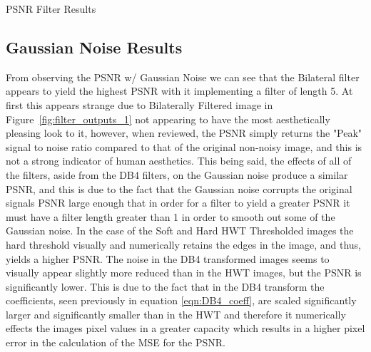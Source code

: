 \documentclass{article}\raggedbottom
\begin{document}
\begin{table}[H]
	\centering
	\caption{PSNR Filter Results}
	\label{tab:psnr_results}
\end{table}

\subsection{Gaussian Noise Results} 
From observing the PSNR w/ Gaussian Noise we can see that the Bilateral filter appears to yield the highest PSNR with it implementing a filter of length 5. At first this appears strange due to Bilaterally Filtered image in Figure~\ref{fig:filter_outputs_1} not appearing to have the most aesthetically pleasing look to it, however, when reviewed, the PSNR simply returns the "Peak" signal to noise ratio compared to that of the original non-noisy image, and this is not a strong indicator of human aesthetics. This being said, the effects of all of the filters, aside from the DB4 filters, on the Gaussian noise produce a similar PSNR, and this is due to the fact that the Gaussian noise corrupts the original signals PSNR large enough that in order for a filter to yield a greater PSNR it must have a filter length greater than 1 in order to smooth out some of the Gaussian noise. In the case of the Soft and Hard HWT Thresholded images the hard threshold visually and numerically retains the edges in the image, and thus, yields a higher PSNR. The noise in the DB4 transformed images seems to visually appear slightly more reduced than in the HWT images, but the PSNR is significantly lower. This is due to the fact that in the DB4 transform the coefficients, seen previously in equation \eqref{eqn:DB4_coeff}, are scaled significantly larger and significantly smaller than in the HWT and therefore it numerically effects the images pixel values in a greater capacity which results in a higher pixel error in the calculation of the MSE for the PSNR.
\end{document}
